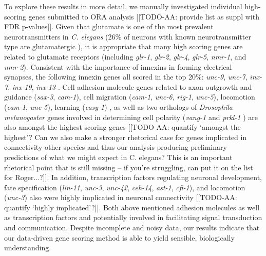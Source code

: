 \documentclass[10pt,letterpaper]{article}
\begin{document}
{To explore these results in more detail, we manually investigated individual high-scoring genes submitted to ORA analysis [[TODO-AA: provide list as suppl with FDR p-values]].
Given that glutamate is one of the most prevalent neurotransmitters in \textit{C. elegans} (26\% of neurons with known neurotransmitter type are glutamatergic \cite{Pereira:2015er}), it is appropriate that many high scoring genes are related to glutamate receptors (including \emph{glr-1}, \emph{glr-2}, \emph{glr-4}, \emph{glr-5}, \emph{nmr-1}, and \emph{nmr-2}).
Consistent with the importance of innexins in forming electrical synapses, the following innexin genes all scored in the top 20\%: \emph{unc-9}, \emph{unc-7}, \emph{inx-7}, \emph{inx-19}, \emph{inx-13} \cite{Starich2001}.
Cell adhesion molecule genes related to axon outgrowth and guidance (\emph{sax-3}, \emph{cam-1}),
cell migration (\emph{cam-1}, \emph{unc-6}, \emph{rig-1}, \emph{unc-5}),
locomotion (\emph{cam-1}, \emph{unc-5}),
learning (\emph{casy-1}) \cite{Zallen1999, Garriga1999, Leung-Hagesteijn1992, Harris:2009kd, Ikeda2008},
as well as two orthologs of \emph{Drosophila melanogaster} genes involved in determining cell polarity (\emph{vang-1} and \emph{prkl-1} \cite{Wu2006, Hoffmann2010}) are also amongst the highest scoring genes [[TODO-AA: quantify `amongst the highest'? Can we also make a stronger rhetorical case for genes implicated in connectivity other species and thus our analysis producing preliminary predictions of what we might expect in C. elegans? This is an important rhetorical point that is still missing -- if you're struggling, can put it on the list for Roger...?]].
In addition, transcription factors regulating neuronal development,
fate specification \cite{Sarafi-Reinach2001 ,Prasad2008, Baran1999, Cassata2000, Schmid2006, Shaham2002a} (\emph{lin-11}, \emph{unc-3}, \emph{unc-42}, \emph{ceh-14}, \emph{ast-1}, \emph{cfi-1}),
and locomotion \cite{Prasad2008} (\emph{unc-3})
also were highly implicated in neuronal connectivity [[TODO-AA: quantify `highly implicated'?]].
Both above mentioned adhesion molecules as well as transcription factors and potentially involved in facilitating signal transduction and communication.
Despite incomplete and noisy data, our results indicate that our data-driven gene scoring method is able to yield sensible, biologically understanding.

}
\end{document}
